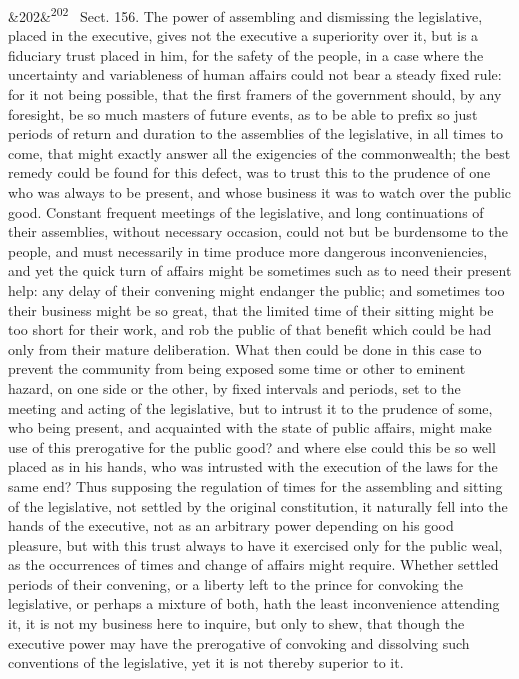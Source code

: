 \documentclass[12pt]{article}
\newcommand{\para}[1][]{\par\noindent\ifx&#1&\else\textsuperscript{\footnotesize #1}~\fi}
\begin{document}
\para[202] Sect. 156. The power of assembling and dismissing the legislative, placed in the executive, gives not the executive a superiority over it, but is a fiduciary trust placed in him, for the safety of the people, in a case where the uncertainty and variableness of human affairs could not bear a steady fixed rule: for it not being possible, that the first framers of the government should, by any foresight, be so much masters of future events, as to be able to prefix so just periods of return and duration to the assemblies of the legislative, in all times to come, that might exactly answer all the exigencies of the commonwealth; the best remedy could be found for this defect, was to trust this to the prudence of one who was always to be present, and whose business it was to watch over the public good. Constant frequent meetings of the legislative, and long continuations of their assemblies, without necessary occasion, could not but be burdensome to the people, and must necessarily in time produce more dangerous inconveniencies, and yet the quick turn of affairs might be sometimes such as to need their present help: any delay of their convening might endanger the public; and sometimes too their business might be so great, that the limited time of their sitting might be too short for their work, and rob the public of that benefit which could be had only from their mature deliberation. What then could be done in this case to prevent the community from being exposed some time or other to eminent hazard, on one side or the other, by fixed intervals and periods, set to the meeting and acting of the legislative, but to intrust it to the prudence of some, who being present, and acquainted with the state of public affairs, might make use of this prerogative for the public good? and where else could this be so well placed as in his hands, who was intrusted with the execution of the laws for the same end? Thus supposing the regulation of times for the assembling and sitting of the legislative, not settled by the original constitution, it naturally fell into the hands of the executive, not as an arbitrary power depending on his good pleasure, but with this trust always to have it exercised only for the public weal, as the occurrences of times and change of affairs might require. Whether settled periods of their convening, or a liberty left to the prince for convoking the legislative, or perhaps a mixture of both, hath the least inconvenience attending it, it is not my business here to inquire, but only to shew, that though the executive power may have the prerogative of convoking and dissolving such conventions of the legislative, yet it is not thereby superior to it.
\end{document}
